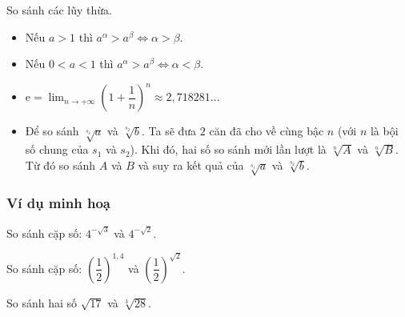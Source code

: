 \begin{dang}{So sánh các lũy thừa.}
	\begin{itemize}
		\item Nếu $a>1$ thì $a^{\alpha} >a^{\beta} \Leftrightarrow \alpha > \beta$. 
		\item Nếu $0<a<1$ thì $a^{\alpha} >a^{\beta} \Leftrightarrow \alpha < \beta$. 
		\item $\displaystyle \mathrm{e} = \lim_{n \to +\infty} \left (1+\dfrac{1}{n}\right )^n  \approx 2{,}718281 \dots$
		\item Để so sánh $\sqrt[s_1]{a}$ và $\sqrt[s_2]{b}$. Ta sẽ đưa $2$ căn đã cho về cùng bậc $n$ (với $n$ là bội số chung của $s_1$ và $s_2$). Khi đó, hai số so sánh mới lần lượt là $\sqrt[n]{A}$ và $\sqrt[n]{B}$. Từ đó so sánh $A$ và $B$ và suy ra kết quả của $\sqrt[s_1]{a}$ và $\sqrt[s_2]{b}$.
	\end{itemize} 
\end{dang}
\subsubsection{Ví dụ minh hoạ}
\begin{vd}%
	So sánh cặp số: $4^{-\sqrt{3}}$ và $4^{-\sqrt{2}}$.
\end{vd}
\begin{vd}%
	So sánh cặp số: $\left (\dfrac{1}{2}\right )^{1{,}4}$ và $\left (\dfrac{1}{2}\right )^{\sqrt{2}}$.
\end{vd}
\begin{vd}%
	So sánh hai số $\sqrt{17}$ và $\sqrt[3]{28}$.
\end{vd}

